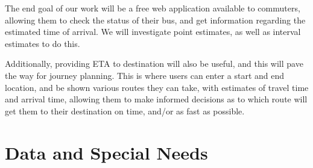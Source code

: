 \documentclass[12pt,a4paper]{article}
\begin{document}
The end goal of our work will be a free web application available to
commuters, allowing them to check the status of their bus,
and get information regarding the estimated time of arrival.
We will investigate point estimates, as well as interval estimates to do this.


Additionally, providing ETA to destination will also be useful,
and this will pave the way for journey planning.
This is where users can enter a start and end location,
and be shown various routes they can take,
with estimates of travel time and arrival time,
allowing them to make informed decisions as to which route will get them
to their destination on time, and/or as fast as possible.









\section{Data and Special Needs}
\label{sec:data}











\end{document}
